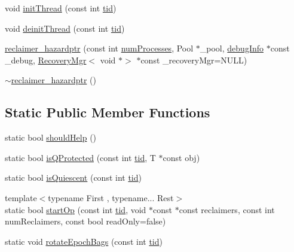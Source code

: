 \begin{DoxyCompactItemize}
\item 
void \hyperlink{classreclaimer__hazardptr_a500063d57382d8168a401fdc633aef10}{init\+Thread} (const int \hyperlink{microbench_2main_8cpp_a9ca9869868fe7e7a38a921cc7de4103f}{tid})
\item 
void \hyperlink{classreclaimer__hazardptr_a8d49e04f16495e585ac4f45267d7edc3}{deinit\+Thread} (const int \hyperlink{microbench_2main_8cpp_a9ca9869868fe7e7a38a921cc7de4103f}{tid})
\item 
\hyperlink{classreclaimer__hazardptr_a14615c6826dcd3856b4b9fb82fa58fa0}{reclaimer\+\_\+hazardptr} (const int \hyperlink{testing_8cpp_aa085812188e21ede75351d88b9b2c30d}{num\+Processes}, Pool $\ast$\+\_\+pool, \hyperlink{classdebugInfo}{debug\+Info} $\ast$const \+\_\+debug, \hyperlink{classRecoveryMgr}{Recovery\+Mgr}$<$ void $\ast$$>$ $\ast$const \+\_\+recovery\+Mgr=N\+U\+LL)
\item 
\hyperlink{classreclaimer__hazardptr_a1efb6e4ae96cea810d2c08ba35c5e2a7}{$\sim$reclaimer\+\_\+hazardptr} ()
\end{DoxyCompactItemize}
\subsection*{Static Public Member Functions}
\begin{DoxyCompactItemize}
\item 
static bool \hyperlink{classreclaimer__hazardptr_a865c5e38124016c29c26485b4455c46b}{should\+Help} ()
\item 
static bool \hyperlink{classreclaimer__hazardptr_acdae0c67eb9c9564394fe473e0f7de08}{is\+Q\+Protected} (const int \hyperlink{microbench_2main_8cpp_a9ca9869868fe7e7a38a921cc7de4103f}{tid}, T $\ast$const obj)
\item 
static bool \hyperlink{classreclaimer__hazardptr_a7726a1aae8e0c6241f2d8789795c3819}{is\+Quiescent} (const int \hyperlink{microbench_2main_8cpp_a9ca9869868fe7e7a38a921cc7de4103f}{tid})
\item 
{\footnotesize template$<$typename First , typename... Rest$>$ }\\static bool \hyperlink{classreclaimer__hazardptr_a38edde73863d8d8aaefd65f591842730}{start\+Op} (const int \hyperlink{microbench_2main_8cpp_a9ca9869868fe7e7a38a921cc7de4103f}{tid}, void $\ast$const $\ast$const reclaimers, const int num\+Reclaimers, const bool read\+Only=false)
\item 
static void \hyperlink{classreclaimer__hazardptr_aa2700ee9ec840f98ff0a6157f8f7388a}{rotate\+Epoch\+Bags} (const int \hyperlink{microbench_2main_8cpp_a9ca9869868fe7e7a38a921cc7de4103f}{tid})
\end{DoxyCompactItemize}
